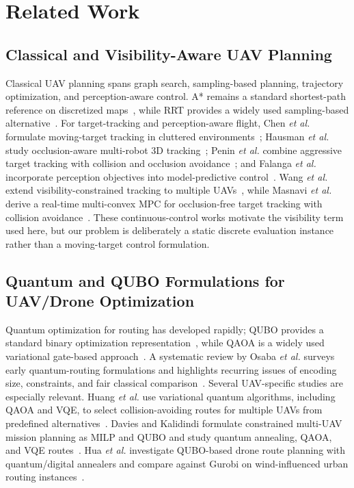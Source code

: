 \documentclass[letterpaper]{article} %
\begin{document}
\section{Related Work}
\subsection{Classical and Visibility-Aware UAV Planning}
Classical UAV planning spans graph search, sampling-based planning, trajectory optimization, and perception-aware control. A* remains a standard shortest-path reference on discretized maps~\cite{hart1968formal}, while RRT provides a widely used sampling-based alternative~\cite{lavalle1998rrt}. For target-tracking and perception-aware flight, Chen \emph{et al.} formulate moving-target tracking in cluttered environments~\cite{chen2016tracking}; Hausman \emph{et al.} study occlusion-aware multi-robot 3D tracking~\cite{hausman2016occlusion}; Penin \emph{et al.} combine aggressive target tracking with collision and occlusion avoidance~\cite{penin2018vision}; and Falanga \emph{et al.} incorporate perception objectives into model-predictive control~\cite{falanga2018pampc}. Wang \emph{et al.} extend visibility-constrained tracking to multiple UAVs~\cite{wang2022multi}, while Masnavi \emph{et al.} derive a real-time multi-convex MPC for occlusion-free target tracking with collision avoidance~\cite{masnavi2022realtime}. These continuous-control works motivate the visibility term used here, but our problem is deliberately a static discrete evaluation instance rather than a moving-target control formulation.

\subsection{Quantum and QUBO Formulations for UAV/Drone Optimization}
Quantum optimization for routing has developed rapidly; QUBO provides a standard binary optimization representation~\cite{glover2019qubo}, while QAOA is a widely used variational gate-based approach~\cite{farhi2014qaoa}. A systematic review by Osaba \emph{et al.} surveys early quantum-routing formulations and highlights recurring issues of encoding size, constraints, and fair classical comparison~\cite{osaba2022review}. Several UAV-specific studies are especially relevant. Huang \emph{et al.} use variational quantum algorithms, including QAOA and VQE, to select collision-avoiding routes for multiple UAVs from predefined alternatives~\cite{huang2022variational}. Davies and Kalidindi formulate constrained multi-UAV mission planning as MILP and QUBO and study quantum annealing, QAOA, and VQE routes~\cite{davies2024mission}. Hua \emph{et al.} investigate QUBO-based drone route planning with quantum/digital annealers and compare against Gurobi on wind-influenced urban routing instances~\cite{hua2024annealing,tarquini2026packing}. 
\end{document}
